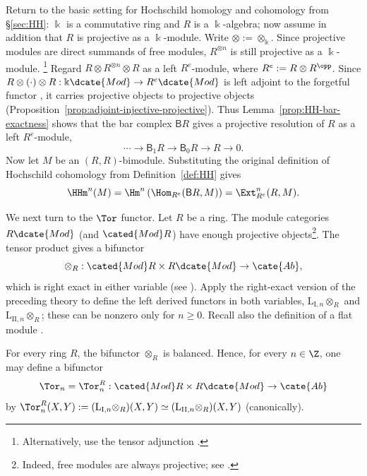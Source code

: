 \begin{example}\label{eg:HH-Ext}
Return to the basic setting for Hochschild homology and cohomology from
\S\ref{sec:HH}: $\Bbbk$ is a commutative ring and $R$ is a
$\Bbbk$-algebra; now assume in addition that $R$ is projective as a
$\Bbbk$-module. Write $\otimes:=\otimes_{\Bbbk}$. Since projective modules
are direct summands of free modules, $R^{\otimes n}$ is still projective as a
$\Bbbk$-module.
\footnote{Alternatively, use the tensor adjunction
\cite[Theorem 6.6.5]{Li1}.}
Regard $R\otimes R^{\otimes n}\otimes R$ as a left $R^e$-module, where
$R^e:=R\otimes R^{\opp}$. Since
$R\otimes(\cdot)\otimes R:\Bbbk\dcate{Mod}\to R^e\dcate{Mod}$ is left
adjoint to the forgetful functor \cite[Corollary 6.6.8]{Li1}, it carries
projective objects to projective objects
(Proposition~\ref{prop:adjoint-injective-projective}). Thus
Lemma~\ref{prop:HH-bar-exactness} shows that the bar complex $\mathsf{B}R$
gives a projective resolution of $R$ as a left $R^e$-module,
\begin{equation}\label{eqn:bar-proj-resolution}
\cdots\to\mathsf{B}_1R\to\mathsf{B}_0R\to R\to0.
\end{equation}
Now let $M$ be an $(R,R)$-bimodule. Substituting the original definition of
Hochschild cohomology from Definition~\ref{def:HH} gives
\[
\HHm^n(M)=\Hm^n\left(\Hom_{R^e}(\mathsf{B}R,M)\right)
=\Ext^n_{R^e}(R,M).
\]
\end{example}

We next turn to the $\Tor$ functor. Let $R$ be a ring. The module categories
$R\dcate{Mod}$ (and $\cated{Mod}R$) have enough projective
objects\footnote{Indeed, free modules are always projective; see
\cite[Example 6.9.6]{Li1}.}. The tensor product gives a bifunctor
\[
\otimes_R:\cated{Mod}R\times R\dcate{Mod}\to\cate{Ab},
\]
which is right exact in either variable (see
\cite[Proposition 6.9.2]{Li1}). Apply the right-exact version of the preceding
theory to define the left derived functors in both variables,
$\mathrm{L}_{\mathrm{I},n}\otimes_R$ and
$\mathrm{L}_{\mathrm{II},n}\otimes_R$; these can be nonzero only for
$n\geq0$. Recall also the definition of a flat module
\cite[Definition 6.9.4]{Li1}.

\begin{definition-proposition}\label{def:Tor-classical}
For every ring $R$, the bifunctor $\otimes_R$ is balanced. Hence, for every
$n\in\Z$, one may define a bifunctor
\[
\Tor_n=\Tor_n^R:\cated{Mod}R\times R\dcate{Mod}\to\cate{Ab}
\]
by
$\Tor_n^R(X,Y):=(\mathrm{L}_{\mathrm{I},n}\otimes_R)(X,Y)\simeq
(\mathrm{L}_{\mathrm{II},n}\otimes_R)(X,Y)$ (canonically).
\end{definition-proposition}

